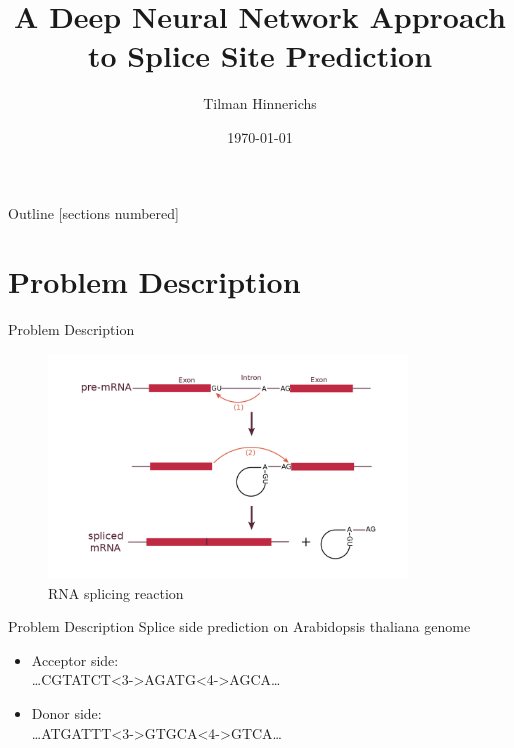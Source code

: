 \documentclass[10pt]{beamer}
\title{A Deep Neural Network Approach to Splice Site Prediction}
\author{Tilman Hinnerichs}
\institute{Knowledge Mining Lab -- KAUST}
\date{\today}
\begin{document}
	
\begin{frame}
	\titlepage
\end{frame}

\begin{frame}{Outline}
	[sections numbered]
	\tableofcontents
\end{frame}

\section{Problem Description}
\begin{frame}{Problem Description}
	\begin{figure}[ht]
		\centering
		\includegraphics[width = 0.85\textwidth]{RNA_splicing_reaction.png}
		\caption{RNA splicing reaction}
	\end{figure}
\end{frame}

\begin{frame}{Problem Description}
	\large Splice side prediction on Arabidopsis thaliana genome
	\vspace{0.5cm}
	\pause
	\begin{itemize}
		\item Acceptor side:\\
			\dots CGTATCT<3->{AG}ATG<4->{AG}CA\dots
		\item Donor side:\\
			\dots ATGATTT<3->{GT}GCA<4->{GT}CA\dots
			
	\end{itemize}
\end{frame}
\end{document}
